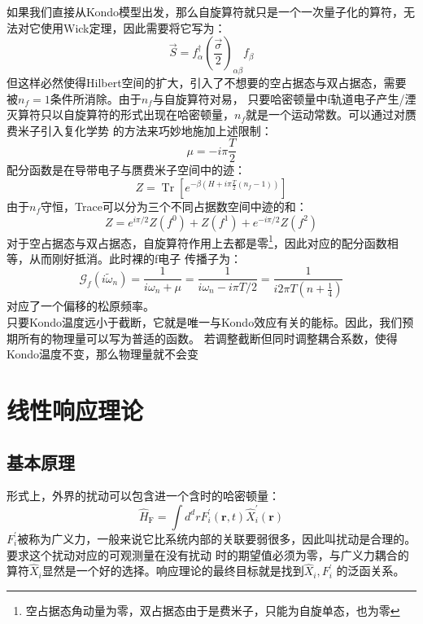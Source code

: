 \documentclass{article}
\begin{document}
如果我们直接从Kondo模型出发，那么自旋算符就只是一个一次量子化的算符，无法对它使用Wick定理，因此需要将它写为：
\begin{equation}
  \vec{S}=f_\alpha^{\dagger}\left(\frac{\vec{\sigma}}{2}\right)_{\alpha \beta} f_\beta
\end{equation}
但这样必然使得Hilbert空间的扩大，引入了不想要的空占据态与双占据态，需要被$ n_f=1 $条件所消除。由于$ n_f $与自旋算符对易，
只要哈密顿量中f轨道电子产生/湮灭算符只以自旋算符的形式出现在哈密顿量，$ n_f $就是一个运动常数。可以通过对赝费米子引入复化学势
的方法来巧妙地施加上述限制：
\begin{equation}
  \mu=-i \pi \frac{T}{2}
\end{equation}  
配分函数是在导带电子与赝费米子空间中的迹：
\begin{equation}
  Z=\operatorname{Tr}\left[e^{-\beta\left(H+i \pi \frac{T}{2}\left(n_f-1\right)\right)}\right]
\end{equation}
由于$ n_f $守恒，Trace可以分为三个不同占据数空间中迹的和：
\begin{equation}
  Z=e^{i \pi / 2} Z\left(f^0\right)+Z\left(f^1\right)+e^{-i \pi / 2} Z\left(f^2\right)
\end{equation} 
对于空占据态与双占据态，自旋算符作用上去都是零\footnote{空占据态角动量为零，双占据态由于是费米子，只能为自旋单态，也为零}，因此对应的配分函数相等，从而刚好抵消。此时裸的f电子
传播子为：
\begin{equation}
  \mathcal{G}_f\left(i \tilde{\omega}_n\right)=\frac{1}{i \omega_n+\mu}=\frac{1}{i \omega_n-i \pi T / 2}=\frac{1}{i 2 \pi T\left(n+\frac{1}{4}\right)}
\end{equation}
对应了一个偏移的松原频率。\\

只要Kondo温度远小于截断，它就是唯一与Kondo效应有关的能标。因此，我们预期所有的物理量可以写为普适的函数。
若调整截断但同时调整耦合系数，使得Kondo温度不变，那么物理量就不会变
\section{线性响应理论}
\subsection{基本原理}
形式上，外界的扰动可以包含进一个含时的哈密顿量：
\begin{equation}
  \hat{H}_{\mathrm{F}}=\int d^d r F_i^{\prime}(\mathbf{r}, t) \hat{X}_i^{\prime}(\mathbf{r})
\end{equation}
$ F_i^{\prime} $被称为广义力，一般来说它比系统内部的关联要弱很多，因此叫扰动是合理的。要求这个扰动对应的可观测量在没有扰动
时的期望值必须为零，与广义力耦合的算符$ \hat{X}_i $显然是一个好的选择。响应理论的最终目标就是找到$ \hat{X}_i,F_i^{\prime} $
的泛函关系。\\
\end{document}
